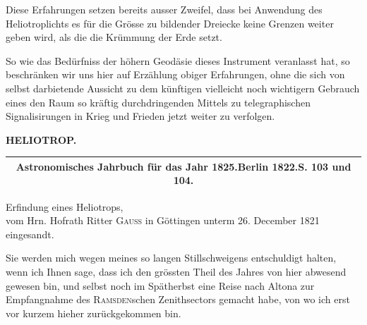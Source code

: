\par\noindent\hspace*{\parindent}Diese Erfahrungen setzen bereits ausser Zweifel, dass bei Anwendung des Heliotroplichts es für die Grösse zu bildender Dreiecke keine Grenzen weiter geben wird, als die die Krümmung der Erde setzt.

\par\noindent\hspace*{\parindent}So wie das Bedürfniss der höhern Geodäsie dieses Instrument veranlasst hat, so beschränken wir uns hier auf Erzählung obiger Erfahrungen, ohne die sich von selbst darbietende Aussicht zu dem künftigen vielleicht noch wichtigern Gebrauch eines den Raum so kräftig durchdringenden Mittels zu telegraphischen Signalisirungen in Krieg und Frieden jetzt weiter zu verfolgen.
\par\vfill\noindent{}\par

\clearpage
\noindent{}\hfill{\small\textbf{HELIOTROP.}}\hfill\null\par\bigskip\bigskip
\begin{center}
\begin{tabular}{c}\hline
\small\textbf{Astronomisches Jahrbuch für das Jahr 1825.\quad Berlin 1822.\quad S. 103 und 104.}\\\hline
\end{tabular}\par\bigskip
{\large Erfindung eines Heliotrops,\\
vom Hrn. Hofrath Ritter \textsc{Gauss} in Göttingen unterm 26. December 1821\\
eingesandt.}
\end{center}
\par\noindent\hspace*{\parindent}Sie werden mich wegen meines so langen Stillschweigens entschuldigt halten, wenn ich Ihnen sage, dass ich den grössten Theil des Jahres von hier abwesend gewesen bin, und selbst noch im Spätherbst eine Reise nach Altona zur Empfangnahme des \textsc{Ramsden}schen Zenithsectors gemacht habe, von wo ich erst vor kurzem hieher zurückgekommen bin.

